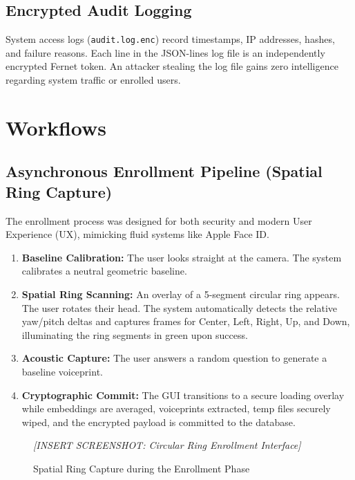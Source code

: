 \documentclass[12pt,a4paper]{article}
\begin{document}
\subsection{Encrypted Audit Logging}
System access logs (\texttt{audit.log.enc}) record timestamps, IP addresses, hashes, and failure reasons. Each line in the JSON-lines log file is an independently encrypted Fernet token. An attacker stealing the log file gains zero intelligence regarding system traffic or enrolled users.

\section{Workflows}

\subsection{Asynchronous Enrollment Pipeline (Spatial Ring Capture)}
The enrollment process was designed for both security and modern User Experience (UX), mimicking fluid systems like Apple Face ID.
\begin{enumerate}
    \item \textbf{Baseline Calibration:} The user looks straight at the camera. The system calibrates a neutral geometric baseline.
    \item \textbf{Spatial Ring Scanning:} An overlay of a 5-segment circular ring appears. The user rotates their head. The system automatically detects the relative yaw/pitch deltas and captures frames for Center, Left, Right, Up, and Down, illuminating the ring segments in green upon success.
    \item \textbf{Acoustic Capture:} The user answers a random question to generate a baseline voiceprint.
    \item \textbf{Cryptographic Commit:} The GUI transitions to a secure loading overlay while embeddings are averaged, voiceprints extracted, temp files securely wiped, and the encrypted payload is committed to the database.
\end{enumerate}

\begin{figure}[H]
    \centering
    \colorbox{placeholderbg}{\parbox{0.8\textwidth}{\centering \vspace{3cm} \textit{[INSERT SCREENSHOT: Circular Ring Enrollment Interface]} \vspace{3cm}}}
    \caption{Spatial Ring Capture during the Enrollment Phase}
    \label{fig:enrollment_ring}
\end{figure}
\end{document}
